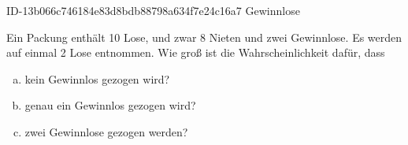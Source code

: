 \begin{exercise}
      {ID-13b066c746184e83d8bdb88798a634f7e24c16a7}
      {Gewinnlose}
  \ifproblem\problem\par
    Ein Packung enthält 10 Lose, und zwar 8 Nieten und zwei Gewinnlose.
    Es werden auf einmal 2 Lose entnommen. Wie groß ist die Wahrscheinlichkeit
    dafür, dass
    \begin{enumerate}[a)]
      \item kein Gewinnlos gezogen wird?
      \item genau ein Gewinnlos gezogen wird?
      \item zwei Gewinnlose gezogen werden?
    \end{enumerate}
  \fi
\end{exercise}
